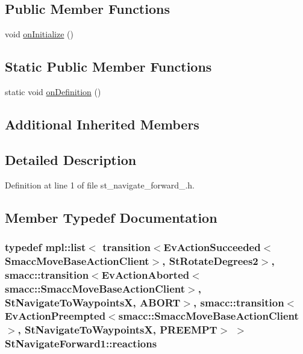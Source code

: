 \subsection*{Public Member Functions}
\begin{DoxyCompactItemize}
\item 
void \hyperlink{structStNavigateForward1_a49134dde57b432385db0ba37201434e0}{on\+Initialize} ()
\end{DoxyCompactItemize}
\subsection*{Static Public Member Functions}
\begin{DoxyCompactItemize}
\item 
static void \hyperlink{structStNavigateForward1_a66864ba466c3c39a40232240dde0a9e3}{on\+Definition} ()
\end{DoxyCompactItemize}
\subsection*{Additional Inherited Members}


\subsection{Detailed Description}


Definition at line 1 of file st\+\_\+navigate\+\_\+forward\+\_.\+h.



\subsection{Member Typedef Documentation}
\subsubsection[{\texorpdfstring{reactions}{reactions}}]{\setlength{\rightskip}{0pt plus 5cm}typedef mpl\+::list$<$ transition$<$Ev\+Action\+Succeeded$<$Smacc\+Move\+Base\+Action\+Client$>$, {\bf St\+Rotate\+Degrees2}$>$, {\bf smacc\+::transition}$<$Ev\+Action\+Aborted$<${\bf smacc\+::\+Smacc\+Move\+Base\+Action\+Client}$>$, {\bf St\+Navigate\+To\+WaypointsX}, {\bf A\+B\+O\+RT}$>$, {\bf smacc\+::transition}$<$Ev\+Action\+Preempted$<${\bf smacc\+::\+Smacc\+Move\+Base\+Action\+Client}$>$, {\bf St\+Navigate\+To\+WaypointsX}, {\bf P\+R\+E\+E\+M\+PT}$>$ $>$ {\bf St\+Navigate\+Forward1\+::reactions}}\hypertarget{structStNavigateForward1_a12580ca7fde6a5e5abb27ff3995aaa25}{}\label{structStNavigateForward1_a12580ca7fde6a5e5abb27ff3995aaa25}


